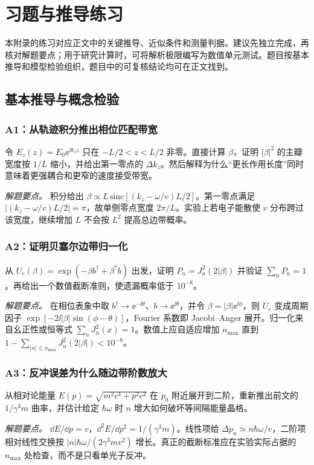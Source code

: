 \chapter{习题与推导练习}
本附录的练习对应正文中的关键推导、近似条件和测量判据。建议先独立完成，再核对解题要点；用于研究计算时，可将解析极限编写为数值单元测试。题目按基本推导和模型检验组织，题目中的可复核结论均可在正文找到。

\section{基本推导与概念检验}
\subsection*{A1：从轨迹积分推出相位匹配带宽}
令 $E_z(z)=E_0\ee^{\ii k_zz}$ 只在 $-L/2<z<L/2$ 非零。直接计算 $\beta$，证明 $|\beta|^2$ 的主瓣宽度按 $1/L$ 缩小，并给出第一零点的 $\Delta k_z$。然后解释为什么“更长作用长度”同时意味着更强耦合和更窄的速度接受带宽。

\textit{解题要点。} 积分给出 $\beta\propto L\,\mathrm{sinc}[(k_z-\omega/v)L/2]$。第一零点满足 $|(k_z-\omega/v)L/2|=\pi$，故单侧零点宽度 $2\pi/L$。实验上若电子能散使 $v$ 分布跨过该宽度，继续增加 $L$ 不会按 $L^2$ 提高总边带概率。

\subsection*{A2：证明贝塞尔边带归一化}
从 $U_e(\beta)=\exp(-\beta b^\dagger+\beta^*b)$ 出发，证明 $P_n=J_n^2(2|\beta|)$ 并验证 $\sum_nP_n=1$。再给出一个数值截断准则，使遗漏概率低于 $10^{-8}$。

\textit{解题要点。} 在相位表象中取 $b^\dagger\to \ee^{-\ii\theta}$、$b\to \ee^{\ii\theta}$，并令 $\beta=|\beta|\ee^{\ii\phi}$，则 $U_e$ 变成周期因子 $\exp[-2\ii|\beta|\sin(\phi-\theta)]$，Fourier 系数即 Jacobi--Anger 展开。归一化来自幺正性或恒等式 $\sum_nJ_n^2(x)=1$。数值上应自适应增加 $n_{\max}$ 直到 $1-\sum_{|n|\le n_{\max}}J_n^2(2|\beta|)<10^{-8}$。

\subsection*{A3：反冲误差为什么随边带阶数放大}
从相对论能量 $E(p)=\sqrt{m^2c^4+p^2c^2}$ 在 $p_0$ 附近展开到二阶，重新推出前文的 $1/\gamma^3m$ 曲率，并估计给定 $\hbar\omega$ 时 $n$ 增大如何破坏等间隔能量晶格。

\textit{解题要点。} $\dd E/\dd p=v$，$\dd ^2E/\dd p^2=1/(\gamma^3m)$。线性项给 $\Delta p_n\simeq n\hbar\omega/v$，二阶项相对线性交换按 $|n|\hbar\omega/(2\gamma^3mv^2)$ 增长。真正的截断标准应在实验实际占据的 $n_{\max}$ 处检查，而不是只看单光子反冲。

